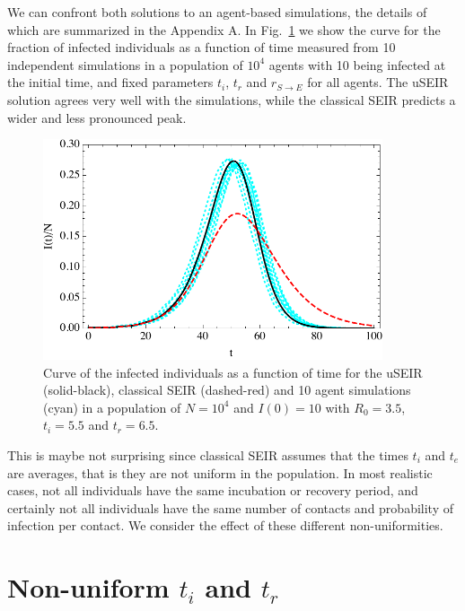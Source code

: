 \documentclass[a4paper,oneside,11pt]{article}
\begin{document}
  We can confront both solutions to an agent-based simulations, the details of which are summarized in the Appendix A.
In Fig.~\ref{fig:fixed} we show the curve for the fraction of infected individuals as a function of time measured from 10 independent simulations in a population of $10^4$ agents with 10 being infected at the initial time, and fixed parameters $t_i$, $t_r$ and $r_{S\rightarrow E}$ for all agents.
The uSEIR solution agrees very well with the simulations, while the classical SEIR predicts a wider and less pronounced peak.

\begin{figure}[h!]
  \centering
  \includegraphics[width=10cm]{fixedraw.pdf}
  \caption{ Curve of the infected individuals as a function of time for the uSEIR (solid-black), classical SEIR (dashed-red) and 10 agent simulations (cyan) in a  population of $N=10^4$ and $I(0)=10$ with $R_0=3.5$, $t_i=5.5$ and $t_r=6.5$.  }
  \label{fig:fixed}
   \end{figure}

  This is maybe not surprising since classical SEIR assumes that the times $t_i$ and $t_e$ are averages, that is they are not uniform in the population. In most realistic cases, not all individuals have the same incubation or recovery period, and certainly not all individuals have the same number of contacts and probability of infection per contact. We consider the effect of these different non-uniformities.

\section{Non-uniform $t_i$ and $t_r$ }
\label{sec:titr}
\end{document}
